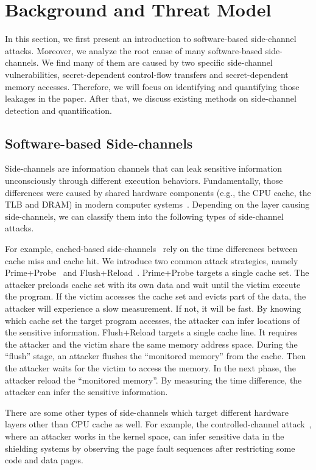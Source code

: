 \section{Background and Threat Model}
In this section, we first present an introduction to software-based side-channel
attacks. Moreover, we analyze the root cause of many software-based
side-channels. We find many of them are caused by two specific side-channel
vulnerabilities, secret-dependent control-flow transfers and secret-dependent
memory accesses. Therefore, we will focus on identifying and quantifying those
leakages in the paper. After that, we discuss existing methods on side-channel
detection and quantification.

\subsection{Software-based Side-channels}
Side-channels are information channels that can leak sensitive information
unconsciously through different execution behaviors.  Fundamentally, those
differences were caused by shared hardware components (e.g., the CPU cache, the
TLB and DRAM) in modern computer systems~\cite{ge2018survey,szefer2019survey}.
Depending on the layer causing side-channels, we can classify them into the
following types of side-channel attacks.

For example, cached-based
side-channels~\cite{yarom2017cachebleed,191010,184415,7163050,Osvik2006,liu2015last,yarom2014flush+}
rely on the time differences between cache miss and cache hit. We introduce two
common attack strategies, namely Prime+Probe~\cite{liu2015last} and
Flush+Reload~\cite{yarom2014flush+}. Prime+Probe targets a single cache set. The
attacker preloads cache set with its own data and wait until the victim execute
the program. If the victim accesses the cache set and evicts part of the data,
the attacker will experience a slow measurement. If not, it will be fast. By
knowing which cache set the target program accesses, the attacker can infer
locations of the sensitive information. Flush+Reload targets a single cache
line. It requires the attacker and the victim share the same memory address
space. During the ``flush'' stage, an attacker flushes the ``monitored memory''
from the cache. Then the attacker waits for the victim to access the memory. In
the next phase, the attacker reload the ``monitored memory''. By measuring the
time difference, the attacker can infer the sensitive information.

There are some other types of side-channels which target different hardware
layers other than CPU cache as well. For example, the controlled-channel
attack~\cite{7163052}, where an attacker works in the kernel space, can infer
sensitive data in the shielding systems by observing the page fault sequences
after restricting some code and data pages.

